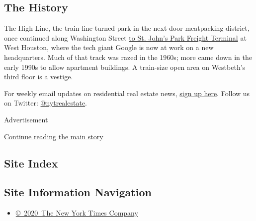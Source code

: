 \hypertarget{the-history}{%
\subsection{The History}\label{the-history}}

The High Line, the train-line-turned-park in the next-door meatpacking
district, once continued along Washington Street
\href{https://www.nytimes.com/1991/01/15/nyregion/elevated-freight-line-being-razed-amid-protests.html?searchResultPosition=3}{to
St. John's Park Freight Terminal} at West Houston, where the tech giant
Google is now at work on a new headquarters. Much of that track was
razed in the 1960s; more came down in the early 1990s to allow apartment
buildings. A train-size open area on Westbeth's third floor is a
vestige.

For weekly email updates on residential real estate news,
\href{http://www.nytimes.com/newsletters/realestate/}{sign up here}.
Follow us on Twitter:
\href{https://twitter.com/nytrealestate}{@nytrealestate}.

Advertisement

\protect\hyperlink{after-bottom}{Continue reading the main story}

\hypertarget{site-index}{%
\subsection{Site Index}\label{site-index}}

\hypertarget{site-information-navigation}{%
\subsection{Site Information
Navigation}\label{site-information-navigation}}

\begin{itemize}
\tightlist
\item
  \href{https://help.nytimes.com/hc/en-us/articles/115014792127-Copyright-notice}{©~2020~The
  New York Times Company}
\end{itemize}

